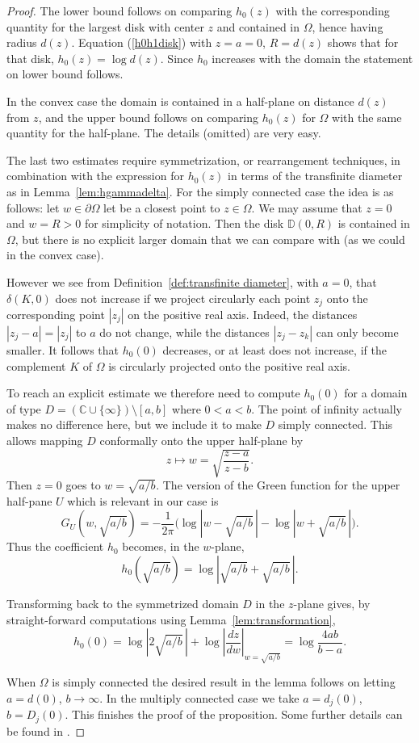 \documentclass[reqno,12pt]{article}
\theoremstyle{plain}
\theoremstyle{definition}
\numberwithin{equation}{section}
\numberwithin{figure}{section}
\def\D{{\mathbb D}}
\def\C{{\mathbb C}}
\begin{document}
\begin{proof}
The lower bound follows on comparing $h_0(z)$ with the corresponding quantity for the largest disk with center $z$
and contained in $\Omega$, hence having radius $d(z)$. Equation (\ref{h0h1disk}) with $z=a=0$, $R=d(z)$ shows
that for that disk, $h_0(z)=\log d(z)$. Since $h_0$ increases with the domain the statement on lower bound follows.

In the convex case the domain is contained in a half-plane on distance $d(z)$ from $z$, and  
the upper bound follows on comparing $h_0(z)$ for $\Omega$ with the same quantity for the half-plane. The
details (omitted) are very easy.

The last two estimates require symmetrization, or rearrangement techniques, in combination with the expression
for $h_0(z)$ in terms of the transfinite diameter as in Lemma~\ref{lem:hgammadelta}.
For the simply connected case the idea is as follows:  let $w\in\partial \Omega$ let be a closest point to $z\in\Omega$. 
We may assume that $z=0$ and $w=R>0$ for simplicity of notation.
Then the disk $\D(0,R)$
is contained in $\Omega$, but there is no explicit larger domain that we can compare with (as we could in the convex
case). 

However we see from Definition~\ref{def:transfinite diameter}, with $a=0$, that $\delta(K,0)$ does not increase if we project circularly
each point $z_j$ onto the corresponding point $|z_j|$ on the positive real axis. Indeed, the distances $|z_j-a|=|z_j|$ to $a$
do not change, while
the distances $|z_j-z_k|$ can only become smaller.  It follows that $h_0(0)$ decreases, or at least does not increase, if the complement $K$
of $\Omega$ is circularly projected onto the positive real axis.

To reach an explicit estimate we therefore need to compute $h_0(0)$ for a domain of type $D=(\C\cup \{\infty\})\setminus [a,b]$ 
where  $0<a<b$. The point of infinity actually makes no difference here, but we include it to make $D$ simply connected. This allows 
mapping $D$ conformally onto the upper half-plane by
$$
z\mapsto w=\sqrt{\frac{z-a}{z-b}}.
$$
Then $z=0$ goes to $w=\sqrt{a/b}$. The version of the Green function for the upper half-pane $U$
which is relevant in our case is
$$
G_{U}(w,\sqrt{a/b})=-\frac{1}{2\pi}\big(\log |w-\sqrt{a/b}\,|-\log |w+\sqrt{a/b}\,|\big).
$$
Thus the coefficient $h_0$ becomes, in the $w$-plane,
$$
h_0(\sqrt{a/b})=\log |\sqrt{a/b}+\sqrt{a/b}\,|.
$$

Transforming back to the symmetrized domain $D$ in the $z$-plane gives,  
by straight-forward computations using Lemma~\ref{lem:transformation},
$$
h_0(0)=\log |2\sqrt{a/b}\,|+\log |\frac{dz}{dw}|_{w=\sqrt{a/b}}=\log \frac{4ab}{b-a}.
$$

When $\Omega$ is simply connected the desired result in the lemma follows on letting $a=d(0)$, $b\to \infty$.
In the multiply connected case we take $a=d_j(0)$, $b=D_j(0)$. This finishes the proof 
of the proposition. Some further details can be found in \cite{Gustafsson-1979}.
\end{proof}
\end{document}
